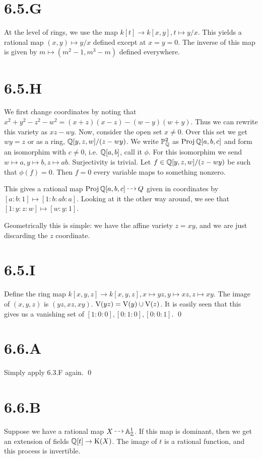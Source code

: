 \documentclass{article}
\begin{document}
\section{6.5.G}
At the level of rings, we use the map $k[t] \to k[x, y], t \mapsto y/x$. This yields a rational map $(x, y) \mapsto y/x$ defined except at $x=y=0$. The inverse of this map is given by $m \mapsto (m^2-1, m^3-m)$ defined everywhere.

\section{6.5.H}
We first change coordinates by noting that $x^2+y^2-z^2-w^2=(x+z)(x-z)-(w-y)(w+y)$. Thus we can rewrite this variety as $xz-wy$. Now, consider the open set $x \neq 0$. Over this set we get $wy=z$ or as a ring, $\mathbb{Q}[y, z, w]/(z-wy)$. We write $\mathbb{P}^2_{\mathbb{Q}}$ as $\operatorname{Proj} \mathbb{Q}[a, b, c]$ and form an isomorphim with $c \neq 0$, i.e. $\mathbb{Q}[a, b]$, call it $\phi$. For this isomorphim we send $w \mapsto a, y \mapsto b, z \mapsto ab$. Surjectivity is trivial. Let $f \in \mathbb{Q}[y, z, w]/(z-wy)$ be such that $\phi(f)=0$. Then $f=0$ every variable maps to something nonzero.

This gives a rational map $\Proj \Q[a, b, c] \rationalto Q$ given in coordinates by $[a : b : 1] \mapsto [1 : b : ab : a]$. Looking at it the other way around, we see that $[1: y : z : w] \mapsto [w : y : 1]$.

Geometrically this is simple: we have the affine variety $z=xy$, and we are just discarding the $z$ coordinate.

\section{6.5.I}
Define the ring map $k[x, y, z] \to k[x, y, z], x \mapsto yz, y \mapsto xz, z \mapsto xy$. The image of $(x, y, z)$ is $(yz, xz, xy)$. $\operatorname{V}(yz)=\operatorname{V}(y) \cup \operatorname{V}(z)$. It is easily seen that this gives us a vanishing set of $[1 : 0 : 0], [0 : 1 : 0], [0 : 0 : 1]$. \qed

\section{6.6.A}
Simply apply 6.3.F again. \qed

\section{6.6.B}
Suppose we have a rational map $X \rationalto \A^1_{\Z}$. If this map is dominant, then we get an extension of fields $\mathbb{Q}[t] \to \operatorname{K}(X)$. The image of $t$ is a rational function, and this process is invertible.
\end{document}
